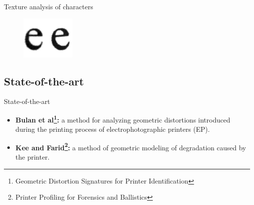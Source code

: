 \documentclass[notes]{beamer}
\begin{document}
\begin{frame}

\begin{block}{Texture analysis of characters}

\begin{figure}[!htb]
\centering
\includegraphics[scale=2]{characters}
\label{fig:characters}
\end{figure}

\end{block}

\end{frame}

\begin{frame}
\section{State-of-the-art}
\begin{block}{State-of-the-art}

\begin{itemize}

\item \textbf{Bulan et al\footnote{Geometric Distortion Signatures for Printer Identification\cite{Geometric_Distortion}}:} a method for
analyzing geometric distortions introduced during the printing process of electrophotographic printers (EP).

\item \textbf{Kee and Farid\footnote{Printer Profiling for Forensics and Ballistics\cite{Printer_Profiling}}:} a method of geometric modeling of degradation caused by the printer.

\end{itemize}

\end{block}
{\let\thefootnote\relax\footnotetext{}}
\end{frame}
\end{document}
